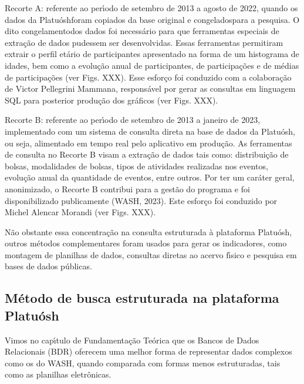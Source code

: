 \documentclass[
12pt,		%
openright,	%
twoside,  %
a4paper,			%
chapter=TITLE,		%
english,			%
french,				%
spanish,			%
brazil				%
]{USPSC-classe/USPSC}
\begin{document}
\begin{alineas}
\item Recorte A: referente ao per\'{\i}odo de setembro de 2013 a agosto de 2022, quando os dados da \textquotedbl Platu\'osh\textquotedbl  foram copiados da base original e \textquotedbl congelados\textquotedbl  para a pesquisa. O dito  \textquotedbl congelamento\textquotedbl  dos dados foi necess\'ario para que ferramentas especiais de extra\c{c}\~ao de dados pudessem ser desenvolvidas. Essas ferramentas permitiram extrair o perfil et\'ario de participantes apresentado na forma de um histograma de idades, bem como a evolu\c{c}\~ao anual de participantes, de participa\c{c}\~oes e de m\'edias de participa\c{c}\~oes (ver Figs. XXX). Esse esfor\c{c}o foi conduzido com a colabora\c{c}\~ao de Victor Pellegrini Mammana,  respons\'avel por gerar as consultas em linguagem SQL para posterior produ\c{c}\~ao dos gr\'aficos (ver Figs. XXX).
\item Recorte B: referente ao per\'{\i}odo de setembro de 2013 a janeiro de 2023, implementado com um sistema de consulta direta na base de dados da \textquotedbl Platu\'osh\textquotedbl , ou seja, alimentado em tempo real pelo aplicativo em produ\c{c}\~ao. As ferramentas de consulta no Recorte B visam a extra\c{c}\~ao de dados tais como: distribui\c{c}\~ao de bolsas, modalidades de bolsas, tipos de atividades realizadas nos eventos, evolu\c{c}\~ao anual da quantidade de eventos,  entre outros. Por ter um car\'ater geral, anonimizado, o Recorte B contribui para a gest\~ao do programa e foi disponibilizado publicamente  (WASH, 2023). Este esfor\c{c}o foi conduzido por Michel Alencar Morandi (ver Figs. XXX).
\end{alineas}

N\~ao obstante essa concentra\c{c}\~ao na consulta estruturada \`a plataforma Platu\'osh, outros m\'etodos complementares foram usados para gerar os indicadores, como montagem de planilhas de dados, consultas diretas ao acervo f\'{\i}sico e pesquisa em bases de dados p\'ublicas.










\subsection[M\'etodo de busca estruturada na plataforma Platu\'osh]{M\'etodo de busca estruturada na plataforma Platu\'osh}\label{M\'etodo de busca estruturada na plataforma Platu\'osh}
Vimos no cap\'{\i}tulo de Fundamenta\c{c}\~ao Te\'orica que os Bancos de Dados Relacionais (BDR) oferecem uma melhor forma de representar dados complexos como os do WASH, quando comparada com formas menos estruturadas, tais como as planilhas eletr\^onicas.
\end{document}
